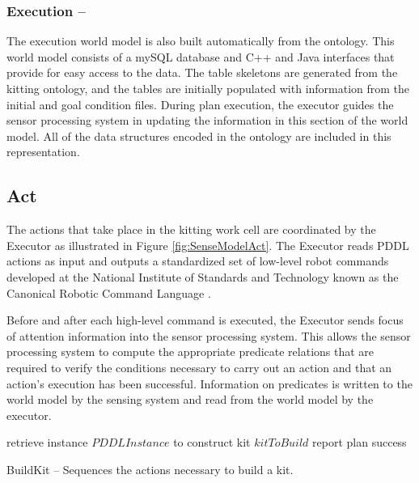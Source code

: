 \documentclass{llncs}
\begin{document}
\subsubsection{Execution --}
The execution world model is also built automatically from the ontology. This world model consists of a mySQL database and C++ and Java
interfaces that provide for easy access to the data. The table skeletons are generated from the kitting ontology, and the tables are initially populated
with information from the initial and goal condition files. During plan execution, the executor guides the sensor processing system
in updating the information in 
this section of the world model. All of the data structures encoded in the ontology are included in this representation. 
%
\subsection{Act}
\label{subsection:Act}
The actions that take place in the kitting work cell are coordinated by the Executor as illustrated in Figure \ref{fig:SenseModelAct}.  The Executor
reads PDDL actions as input and outputs a standardized set of low-level robot commands developed at the National Institute of Standards
and Technology known as the  Canonical Robotic Command Language \cite{Balakirsky2012-1}. 

Before and after each high-level command
is executed, the Executor sends focus of attention information into the sensor processing system. This allows the sensor processing system to compute
the appropriate predicate relations that are required to verify the conditions necessary to carry out an action and that an action's execution has
been successful. Information on predicates is written to the world model by the sensing system and read from the world model by the executor.
%
\\
\begin{algorithm}[h!]

 	retrieve instance $PDDLInstance$ to construct kit $kitToBuild$\;
 	report plan success\;
\caption{{\sc BuildKit} -- Sequences the actions necessary to build a kit.}
\label{fig:buildkit}
\end{algorithm}
%
\end{document}
